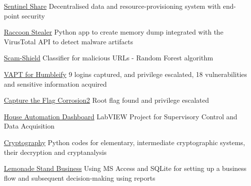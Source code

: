 \vspace{-4.0mm} 
\begin{cvskills}


\cvskill
    {\href{https://github.com/asr-24/SentinelShare}{Sentinel Share}} %
    {Decentralised data and resource-provisioning system with end-point security} %

\cvskill
    {\href{https://github.com/asr-24/RaccoonStealer}{Raccoon Stealer}} %
    {Python app to create memory dump integrated with the VirusTotal API to detect malware artifacts} %

\cvskill
    {\href{https://github.com/asr-24/ScamShield}{Scam-Shield}} %
    {Classifier for malicious URLs - Random Forest algorithm} %

\cvskill
    {\href{https://github.com/asr-24/Humbleify_VAPTReport}{VAPT for Humbleify}} %
    {9 logins captured, and privilege escalated, 18 vulnerabilities and sensitive information acquired} %

\cvskill
    {\href{https://github.com/asr-24/CTF-Corrosion2}{Capture the Flag Corrosion2}} %
    {Root flag found and privilege escalated} %

\cvskill
    {\href{https://github.com/asr-24/HouseAutomationSystem}{House Automation Dashboard}} %
    {LabVIEW Project for Supervisory Control and Data Acquisition} %

\cvskill
    {\href{https://github.com/asr-24/Cryptography1}{Cryptography}} %
    {Python codes for elementary, intermediate cryptographic systems, their decryption and cryptanalysis} %

\cvskill
    {\href{https://github.com/asr-24/LemonadeStandCaseStudy}{Lemonade Stand Business}} %
    {Using MS Access and SQLite for setting up a business flow and subsequent decision-making using reports} %


\vspace{-3.0mm} 
\end{cvskills}